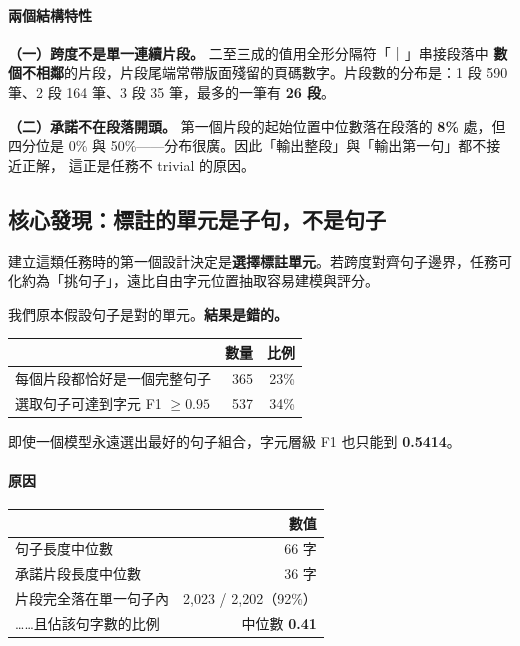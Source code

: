 \documentclass[11pt,a4paper]{ctexart}
\begin{document}
\paragraph{兩個結構特性}

\textbf{（一）跨度不是單一連續片段。} 二至三成的值用全形分隔符「｜」串接段落中
\textbf{數個不相鄰}的片段，片段尾端常帶版面殘留的頁碼數字。片段數的分布是：1 段
590 筆、2 段 164 筆、3 段 35 筆，最多的一筆有 \textbf{26 段}。

\textbf{（二）承諾不在段落開頭。} 第一個片段的起始位置中位數落在段落的 \textbf{8\%}
處，但四分位是 0\% 與 50\%——分布很廣。因此「輸出整段」與「輸出第一句」都不接近正解，
這正是任務不 trivial 的原因。

\subsection{核心發現：標註的單元是子句，不是句子}
\label{sec:unit}

建立這類任務時的第一個設計決定是\textbf{選擇標註單元}。若跨度對齊句子邊界，任務可
化約為「挑句子」，遠比自由字元位置抽取容易建模與評分。

我們原本假設句子是對的單元。\textbf{結果是錯的。}

\begin{table}[h]
\centering\small
\begin{tabular}{@{}lrr@{}}
\toprule
 & 數量 & 比例 \\
\midrule
每個片段都恰好是一個完整句子 & 365 & 23\% \\
選取句子可達到字元 F1 $\ge 0.95$ & 537 & 34\% \\
\bottomrule
\end{tabular}
\end{table}

\begin{tcolorbox}[colback=red!5, colframe=red!50, title=句子選取的上界只有 0.5414]
即使一個模型永遠選出最好的句子組合，字元層級 F1 也只能到 \textbf{0.5414}。
\end{tcolorbox}

\paragraph{原因}

\begin{table}[h]
\centering\small
\begin{tabular}{@{}lr@{}}
\toprule
 & 數值 \\
\midrule
句子長度中位數 & 66 字 \\
承諾片段長度中位數 & 36 字 \\
片段完全落在單一句子內 & 2{,}023 / 2{,}202（92\%） \\
\rowcolor{yellow!15}
\quad ……且佔該句字數的比例 & 中位數 \textbf{0.41} \\
\bottomrule
\end{tabular}
\end{table}
\end{document}
